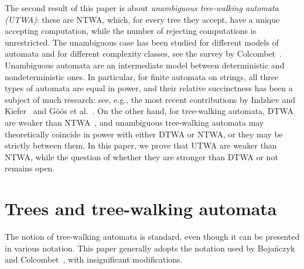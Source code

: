 \documentclass[12pt,a4paper]{article}
\theoremstyle{definition}
\begin{document}
The second result of this paper is about \emph{unambiguous tree-walking automata (UTWA)}:
these are NTWA, which, for every tree they accept,
have a unique accepting computation, while the number of rejecting computations is unrestricted.
The unambiguous case has been studied for different models of automata
and for different complexity classes,
see the survey by Colcombet~\cite{Colcombet_unambiguity}.
Unambiguous automata are an intermediate model between deterministic and nondeterministic ones.
In particular, for finite automata on strings,
all three types of automata are equal in power,
and their relative succinctness has been a subject of much research:
see, e.g., the most recent contributions by Indzhev and Kiefer~\cite{IndzhevKiefer}
and G\"o\"os et al.~\cite{GoosKieferYuan}.
On the other hand, for tree-walking automata,
DTWA are weaker than NTWA~\cite{BojanczykColcombet_det},
and unambiguous tree-walking automata may theoretically coincide in power with either DTWA or NTWA,
or they may be strictly between them.
In this paper, we prove that UTWA are weaker than NTWA,
while the question of whether they are stronger than DTWA or not remains open.







\section{Trees and tree-walking automata}\label{section_definitions}

The notion of tree-walking automata is standard,
even though it can be presented in various notation.
This paper generally adopts the notation used by Boja\'nczyk and Colcombet~\cite{BojanczykColcombet_reg},
with insignificant modifications.
\end{document}
